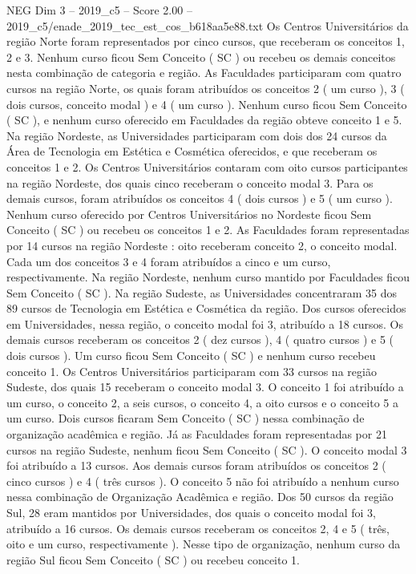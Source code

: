 \begin{textsample}{NEG Dim 3 – 2019\_c5 – Score 2.00 – 2019\_c5/enade\_2019\_tec\_est\_cos\_b618aa5e88.txt}
Os Centros Universitários da região Norte foram representados por cinco cursos, que receberam os conceitos 1, 2 e 3.
Nenhum curso ficou Sem Conceito ( SC ) ou recebeu os demais conceitos nesta combinação de categoria e região.
As Faculdades participaram com quatro cursos na região Norte, os quais foram atribuídos os conceitos 2 ( um curso ), 3 ( dois cursos, conceito modal ) e 4 ( um curso ).
Nenhum curso ficou Sem Conceito ( SC ), e nenhum curso oferecido em Faculdades da região obteve conceito 1 e 5.
Na região Nordeste, as Universidades participaram com dois dos 24 cursos da Área de Tecnologia em Estética e Cosmética oferecidos, e que receberam os conceitos 1 e 2.
Os Centros Universitários contaram com oito cursos participantes na região Nordeste, dos quais cinco receberam o conceito modal 3.
Para os demais cursos, foram atribuídos os conceitos 4 ( dois cursos ) e 5 ( um curso ).
Nenhum curso oferecido por Centros Universitários no Nordeste ficou Sem Conceito ( SC ) ou recebeu os conceitos 1 e 2.
As Faculdades foram representadas por 14 cursos na região Nordeste : oito receberam conceito 2, o conceito modal.
Cada um dos conceitos 3 e 4 foram atribuídos a cinco e um curso, respectivamente.
Na região Nordeste, nenhum curso mantido por Faculdades ficou Sem Conceito ( SC ).
Na região Sudeste, as Universidades concentraram 35 dos 89 cursos de Tecnologia em Estética e Cosmética da região.
Dos cursos oferecidos em Universidades, nessa região, o conceito modal foi 3, atribuído a 18 cursos.
Os demais cursos receberam os conceitos 2 ( dez cursos ), 4 ( quatro cursos ) e 5 ( dois cursos ).
Um curso ficou Sem Conceito ( SC ) e nenhum curso recebeu conceito 1.
Os Centros Universitários participaram com 33 cursos na região Sudeste, dos quais 15 receberam o conceito modal 3.
O conceito 1 foi atribuído a um curso, o conceito 2, a seis cursos, o conceito 4, a oito cursos e o conceito 5 a um curso.
Dois cursos ficaram Sem Conceito ( SC ) nessa combinação de organização acadêmica e região.
Já as Faculdades foram representadas por 21 cursos na região Sudeste, nenhum ficou Sem Conceito ( SC ).
O conceito modal 3 foi atribuído a 13 cursos.
Aos demais cursos foram atribuídos os conceitos 2 ( cinco cursos ) e 4 ( três cursos ).
O conceito 5 não foi atribuído a nenhum curso nessa combinação de Organização Acadêmica e região.
Dos 50 cursos da região Sul, 28 eram mantidos por Universidades, dos quais o conceito modal foi 3, atribuído a 16 cursos.
Os demais cursos receberam os conceitos 2, 4 e 5 ( três, oito e um curso, respectivamente ).
Nesse tipo de organização, nenhum curso da região Sul ficou Sem Conceito ( SC ) ou recebeu conceito 1.

\end{textsample}
